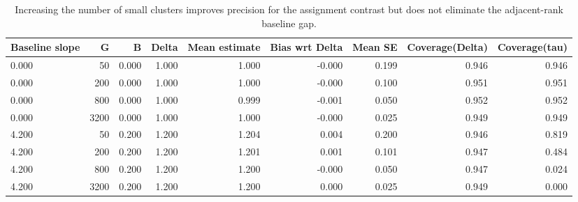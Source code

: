 \begin{table}[!htbp]
\centering
\caption{Increasing the number of small clusters improves precision for the assignment contrast but does not eliminate the adjacent-rank baseline gap.}
\label{tab:many-small-simulation}
\begin{tabular}{lrrrrrrrr}
\toprule
Baseline slope & G & B & Delta & Mean estimate & Bias wrt Delta & Mean SE & Coverage(Delta) & Coverage(tau) \\
\midrule
0.000 & 50 & 0.000 & 1.000 & 1.000 & -0.000 & 0.199 & 0.946 & 0.946 \\
0.000 & 200 & 0.000 & 1.000 & 1.000 & -0.000 & 0.100 & 0.951 & 0.951 \\
0.000 & 800 & 0.000 & 1.000 & 0.999 & -0.001 & 0.050 & 0.952 & 0.952 \\
0.000 & 3200 & 0.000 & 1.000 & 1.000 & -0.000 & 0.025 & 0.949 & 0.949 \\
4.200 & 50 & 0.200 & 1.200 & 1.204 & 0.004 & 0.200 & 0.946 & 0.819 \\
4.200 & 200 & 0.200 & 1.200 & 1.201 & 0.001 & 0.101 & 0.947 & 0.484 \\
4.200 & 800 & 0.200 & 1.200 & 1.200 & -0.000 & 0.050 & 0.947 & 0.024 \\
4.200 & 3200 & 0.200 & 1.200 & 1.200 & 0.000 & 0.025 & 0.949 & 0.000 \\
\bottomrule
\end{tabular}
\end{table}
